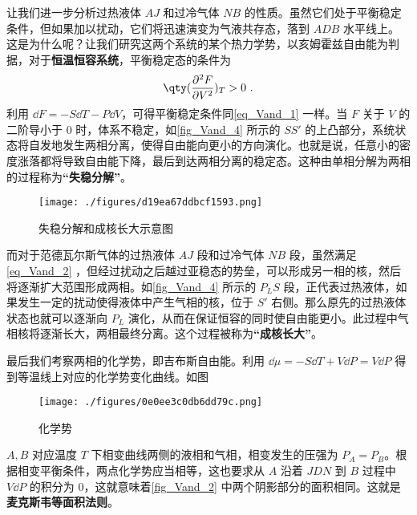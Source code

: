 让我们进一步分析过热液体 $AJ$ 和过冷气体 $NB$ 的性质。虽然它们处于平衡稳定条件，但如果加以扰动，它们将迅速演变为气液共存态，落到 $ADB$ 水平线上。这是为什么呢？让我们研究这两个系统的某个热力学势，以亥姆霍兹自由能为判据，对于\textbf{恒温恒容系统}，平衡稳定态的条件为
\begin{equation}\label{eq_Vand_2}
\qty(\frac{\partial^2 F}{\partial V^2})_T>0~.
\end{equation}
利用 $\dd F=-S\dd T-P\dd V$，可得平衡稳定条件同\autoref{eq_Vand_1} 一样。当 $F$ 关于 $V$ 的二阶导小于 $0$ 时，体系不稳定，如\autoref{fig_Vand_4} 所示的 $SS'$ 的上凸部分，系统状态将自发地发生两相分离，使得自由能向更小的方向演化。也就是说，任意小的密度涨落都将导致自由能下降，最后到达两相分离的稳定态。这种由单相分解为两相的过程称为\textbf{“失稳分解”}。
\begin{figure}[ht]
\centering
\texttt{[image: ./figures/d19ea67ddbcf1593.png]}
\caption{失稳分解和成核长大示意图} \label{fig_Vand_4}
\end{figure}
而对于范德瓦尔斯气体的过热液体 $AJ$ 段和过冷气体 $NB$ 段，虽然满足\autoref{eq_Vand_2} ，但经过扰动之后越过亚稳态的势垒，可以形成另一相的核，然后将逐渐扩大范围形成两相。如\autoref{fig_Vand_4} 所示的 $P_LS$ 段，正代表过热液体，如果发生一定的扰动使得液体中产生气相的核，位于 $S'$ 右侧。那么原先的过热液体状态也就可以逐渐向 $P_L$ 演化，从而在保证恒容的同时使自由能更小。此过程中气相核将逐渐长大，两相最终分离。这个过程被称为\textbf{“成核长大”}。



最后我们考察两相的化学势，即吉布斯自由能。利用 $\dd \mu=-S\dd T+V\dd P=V\dd P$ 得到等温线上对应的化学势变化曲线。如图

\begin{figure}[ht]
\centering
\texttt{[image: ./figures/0e0ee3c0db6dd79c.png]}
\caption{化学势} \label{fig_Vand_3}
\end{figure}
$A,B$ 对应温度 $T$ 下相变曲线两侧的液相和气相，相变发生的压强为 $P_A=P_B$。根据相变平衡条件，两点化学势应当相等，这也要求从 $A$ 沿着 $JDN$ 到 $B$ 过程中 $V\dd P$ 的积分为 $0$，这就意味着\autoref{fig_Vand_2} 中两个阴影部分的面积相同。这就是\textbf{麦克斯韦等面积法则}。
